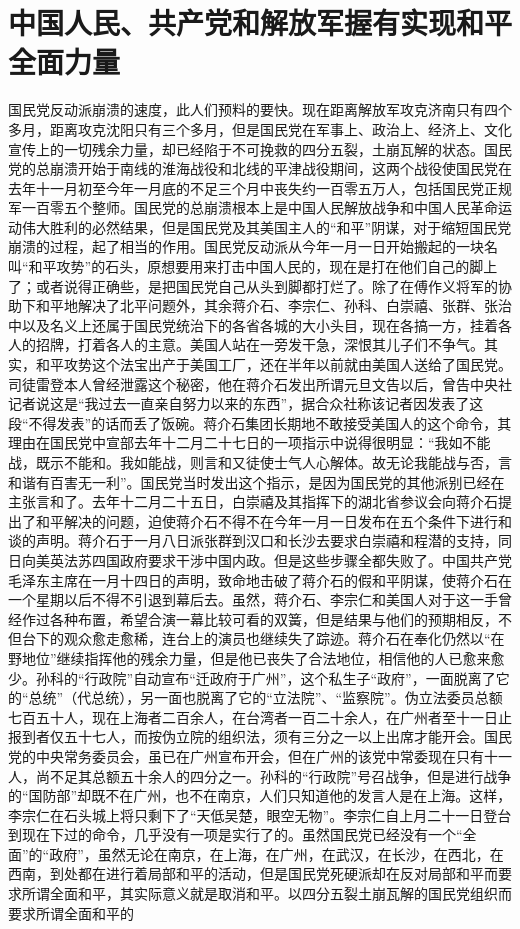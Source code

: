 \section[中国人民、共产党和解放军握有实现和平全面力量（一九四九年二月十五日）]{中国人民、共产党和解放军握有实现和平全面力量}


国民党反动派崩溃的速度，此人们预料的要快。现在距离解放军攻克济南只有四个多月，距离攻克沈阳只有三个多月，但是国民党在军事上、政治上、经济上、文化宣传上的一切残余力量，却已经陷于不可挽救的四分五裂，土崩瓦解的状态。国民党的总崩溃开始于南线的淮海战役和北线的平津战役期间，这两个战役使国民党在去年十一月初至今年一月底的不足三个月中丧失约一百零五万人，包括国民党正规军一百零五个整师。国民党的总崩溃根本上是中国人民解放战争和中国人民革命运动伟大胜利的必然结果，但是国民党及其美国主人的“和平”阴谋，对于缩短国民党崩溃的过程，起了相当的作用。国民党反动派从今年一月一日开始搬起的一块名叫“和平攻势”的石头，原想要用来打击中国人民的，现在是打在他们自己的脚上了；或者说得正确些，是把国民党自己从头到脚都打烂了。除了在傅作义将军的协助下和平地解决了北平问题外，其余蒋介石、李宗仁、孙科、白崇禧、张群、张治中以及名义上还属于国民党统治下的各省各城的大小头目，现在各搞一方，挂着各人的招牌，打着各人的主意。美国人站在一旁发干急，深恨其儿子们不争气。其实，和平攻势这个法宝出产于美国工厂，还在半年以前就由美国人送给了国民党。司徒雷登本人曾经泄露这个秘密，他在蒋介石发出所谓元旦文告以后，曾告中央社记者说这是“我过去一直亲自努力以来的东西”，据合众社称该记者因发表了这段“不得发表”的话而丢了饭碗。蒋介石集团长期地不敢接受美国人的这个命令，其理由在国民党中宣部去年十二月二十七日的一项指示中说得很明显：“我如不能战，既示不能和。我如能战，则言和又徒使士气人心解体。故无论我能战与否，言和谐有百害无一利”。国民党当时发出这个指示，是因为国民党的其他派别已经在主张言和了。去年十二月二十五日，白崇禧及其指挥下的湖北省参议会向蒋介石提出了和平解决的问题，迫使蒋介石不得不在今年一月一日发布在五个条件下进行和谈的声明。蒋介石于一月八日派张群到汉口和长沙去要求白崇禧和程潜的支持，同日向美英法苏四国政府要求干涉中国内政。但是这些步骤全都失败了。中国共产党毛泽东主席在一月十四日的声明，致命地击破了蒋介石的假和平阴谋，使蒋介石在一个星期以后不得不引退到幕后去。虽然，蒋介石、李宗仁和美国人对于这一手曾经作过各种布置，希望合演一幕比较可看的双簧，但是结果与他们的预期相反，不但台下的观众愈走愈稀，连台上的演员也继续失了踪迹。蒋介石在奉化仍然以“在野地位”继续指挥他的残余力量，但是他已丧失了合法地位，相信他的人已愈来愈少。孙科的“行政院”自动宣布“迁政府于广州”，这个私生子“政府”，一面脱离了它的“总统”（代总统），另一面也脱离了它的“立法院”、“监察院”。伪立法委员总额七百五十人，现在上海者二百余人，在台湾者一百二十余人，在广州者至十一日止报到者仅五十七人，而按伪立院的组织法，须有三分之一以上出席才能开会。国民党的中央常务委员会，虽已在广州宣布开会，但在广州的该党中常委现在只有十一人，尚不足其总额五十余人的四分之一。孙科的“行政院”号召战争，但是进行战争的“国防部”却既不在广州，也不在南京，人们只知道他的发言人是在上海。这样，李宗仁在石头城上将只剩下了“天低吴楚，眼空无物”。李宗仁自上月二十一日登台到现在下过的命令，几乎没有一项是实行了的。虽然国民党已经没有一个“全面”的“政府”，虽然无论在南京，在上海，在广州，在武汉，在长沙，在西北，在西南，到处都在进行着局部和平的活动，但是国民党死硬派却在反对局部和平而要求所谓全面和平，其实际意义就是取消和平。以四分五裂土崩瓦解的国民党组织而要求所谓全面和平的